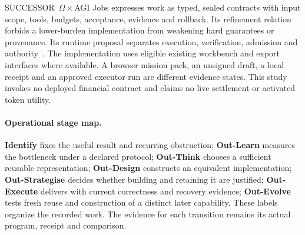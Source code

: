 SUCCESSOR~$\Omega\times$AGI Jobs expresses work as typed, sealed contracts with input scope, tools, budgets, acceptance, evidence and rollback. Its refinement relation forbids a lower-burden implementation from weakening hard guarantees or provenance. Its runtime proposal separates execution, verification, admission and authority~\cite[PDF pp.~16--19, 54, 71, 82--83]{successor_jobs}. The implementation uses eligible existing workbench and export interfaces where available. A browser mission pack, an unsigned draft, a local receipt and an approved executor run are different evidence states. This study invokes no deployed financial contract and claims no live settlement or activated token utility.

\paragraph{Operational stage map.}
\textbf{Identify} fixes the useful result and recurring obstruction; \textbf{Out-Learn} measures the bottleneck under a declared protocol; \textbf{Out-Think} chooses a sufficient reusable representation; \textbf{Out-Design} constructs an equivalent implementation; \textbf{Out-Strategise} decides whether building and retaining it are justified; \textbf{Out-Execute} delivers with current correctness and recovery evidence; \textbf{Out-Evolve} tests fresh reuse and construction of a distinct later capability. These labels organize the recorded work. The evidence for each transition remains its actual program, receipt and comparison.
